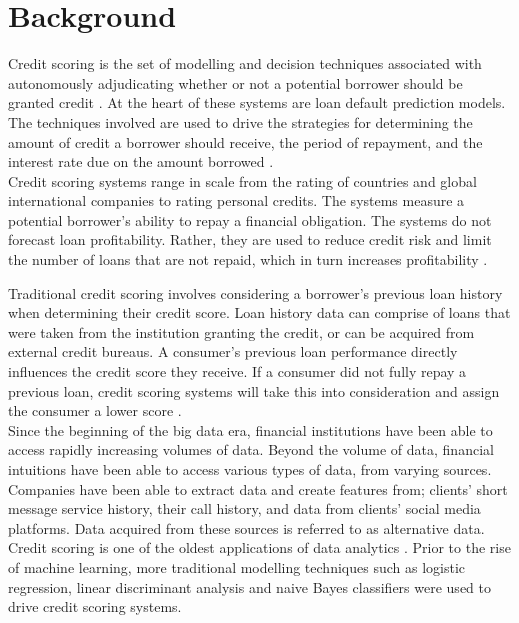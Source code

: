 \section{Background}

Credit scoring is the set of modelling and decision techniques associated with autonomously adjudicating whether or not a potential borrower should be granted credit \parencite{PerceptronScoring}. At the heart of these systems are loan default prediction models. The techniques involved are used to drive the strategies for determining the amount of credit a borrower should receive, the period of repayment, and the interest rate due on the amount borrowed \parencite{CreditRiskSummary}. \\

Credit scoring systems range in scale from the rating of countries and global international companies to rating personal credits. The systems measure a potential borrower's ability to repay a financial obligation. The systems do not forecast loan profitability. Rather, they are used to reduce credit risk and limit the number of loans that are not repaid, which in turn increases profitability \parencite{EarlyNNScoring}. \newpage

Traditional credit scoring involves considering a borrower's previous loan history when determining their credit score. Loan history data can comprise of loans that were taken from the institution granting the credit, or can be acquired from external credit bureaus. A consumer's previous loan performance directly influences the credit score they receive. If a consumer did not fully repay a previous loan, credit scoring systems will take this into consideration and assign the consumer a lower score \parencite{DynamicBehaviouralScoring}. \\

Since the beginning of the big data era, financial institutions have been able to access rapidly increasing volumes of data. Beyond the volume of data, financial intuitions have been able to access various types of data, from varying sources. Companies have been able to extract data and create features from; clients' short message service history, their call history, and data from clients' social media platforms. Data acquired from these sources is referred to as alternative data.\\

Credit scoring is one of the oldest applications of data analytics \parencite{IntroToCreditModelling}. Prior to the rise of machine learning, more traditional modelling techniques such as logistic regression, linear discriminant analysis and naive Bayes classifiers were used to drive credit scoring systems. \\

